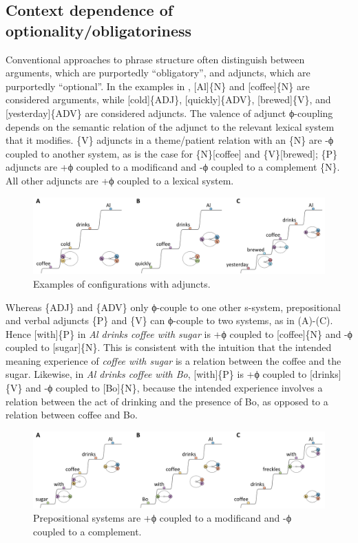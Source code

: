 \subsection{Context dependence of optionality/obligatoriness}

Conventional approaches to phrase structure often distinguish between arguments, which are purportedly “obligatory”, and adjuncts, which are purportedly “optional”. In the examples in {}, [Al]\{N\} and [coffee]\{N\} are considered arguments, while [cold]\{ADJ\}, [quickly]\{ADV\}, [brewed]\{V\}, and [yesterday]\{ADV\} are considered adjuncts. The valence of adjunct ϕ-coupling depends on the semantic relation of the adjunct to the relevant lexical system that it modifies. \{V\} adjuncts in a theme/patient relation with an \{N\} are -ϕ coupled to another system, as is the case for \{N\}[coffee] and \{V\}[brewed]; \{P\} adjuncts are +ϕ coupled to a modificand and -ϕ coupled to a complement \{N\}. All other adjuncts are +ϕ coupled to a lexical system.

  
\begin{figure}
\includegraphics[width=\textwidth]{figures/Tilsen-img83.png}
\caption{Examples of configurations with adjuncts.}
\label{fig:4:33}
\end{figure}
 

  Whereas \{ADJ\} and \{ADV\} only ϕ-couple to one other s-system, prepositional and verbal adjuncts \{P\} and \{V\} can ϕ-couple to two systems, as in {}(A)-(C). Hence [with]\{P\} in \textit{Al drinks coffee with sugar} is +ϕ coupled to [coffee]\{N\} and -ϕ coupled to [sugar]\{N\}. This is consistent with the intuition that the intended meaning experience of \textit{coffee with sugar} is a relation between the coffee and the sugar. Likewise, in \textit{Al drinks coffee with Bo}, [with]\{P\} is +ϕ coupled to [drinks]\{V\} and -ϕ coupled to [Bo]\{N\}, because the intended experience involves a relation between the act of drinking and the presence of Bo, as opposed to a relation between coffee and Bo.

  
\begin{figure}
\includegraphics[width=\textwidth]{figures/Tilsen-img84.png}
\caption{Prepositional systems are +ϕ coupled to a modificand and -ϕ coupled to a complement.}
\label{fig:4:34}
\end{figure}
 

